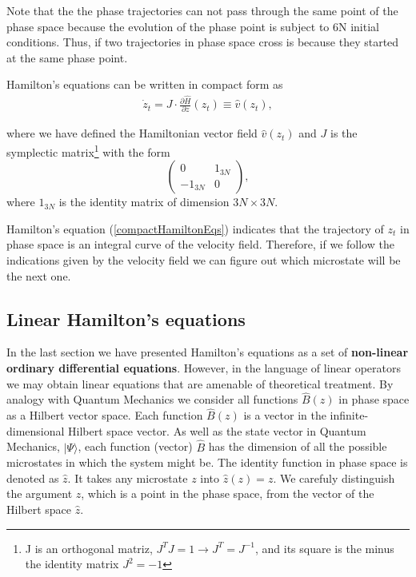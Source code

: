 \documentclass[a4paper,openright,12pt]{book}
\newcommand{\Note}[1]{{\bf \color{red}#1}}    %
\begin{document}
Note that the the phase trajectories can not pass through the same point of the phase space because the evolution of the phase point is subject to 6N initial conditions. 
Thus, if two trajectories in phase space cross is because they started at the same phase point.  


Hamilton's equations can be written in compact form as
\begin{align}
  \dot{z}_t = J\cdot\frac{\partial\hat{H}}{\partial{z}}(z_t)\equiv \hat{v}(z_t),
  \label{compactHamiltonEqs}
\end{align}

where we have defined the Hamiltonian vector field $\hat{v}(z_t)$ and $J$ is the symplectic matrix\footnote{J is an orthogonal matriz, $J^TJ=1\to J^T = J^{-1}$, and its square is the minus the identity matrix $J^2=-1$} with the form
$$
\begin{pmatrix} 
  0 & 1_{3N} \\
  -1_{3N} & 0 
\end{pmatrix},
$$
where $1_{3N}$ is the identity matrix of dimension $3N \times 3N$.

Hamilton's equation (\ref{compactHamiltonEqs}) indicates that the trajectory of $z_t$ in phase space is an integral curve of the velocity field. Therefore, if we follow the indications given by the velocity field we can figure out which microstate will be the next one. 


\subsection{Linear Hamilton's equations}
In the last section we have presented Hamilton's equations as a set of \Note{non-linear ordinary differential equations}. However, in the language of linear operators we may obtain linear equations that are amenable of theoretical treatment. 
By analogy with Quantum Mechanics we consider all functions $\hat{B}(z)$ in phase space as a Hilbert vector space. Each function $\hat{B}(z)$ is a vector in the infinite-dimensional Hilbert space vector. As well as the state vector in Quantum Mechanics, $|\Psi\rangle$, each function (vector) $\hat{B}$ has the dimension of all the possible microstates in which the system might be. 
The identity function in phase space is denoted as $\hat{z}$. It takes any microstate $z$ into $\hat{z}(z)=z$. 
We carefuly distinguish the argument $z$, which is a point in the phase space, from the vector of the Hilbert space $\hat{z}$.     
\end{document}
